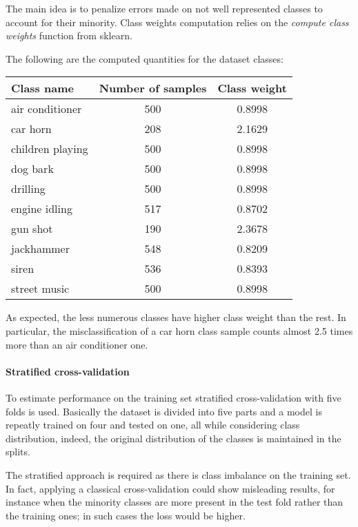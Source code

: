 The main idea is to penalize errors made on not well represented classes to account 
for their minority. Class weights computation relies on the \emph{compute class weights} function
from sklearn.~\cite{classweight}

The following are the computed quantities for the dataset classes:
\begin{center}
    \begin{tabular}{ |l|c|c| } 
        \hline
        Class name & Number of samples & Class weight \\
        \hline
        air conditioner & 500 & 0.8998 \\
        car horn & 208 & 2.1629 \\
        children playing & 500 & 0.8998 \\
        dog bark & 500 & 0.8998 \\
        drilling & 500 & 0.8998 \\
        engine idling & 517 & 0.8702 \\
        gun shot & 190 & 2.3678 \\
        jackhammer & 548 & 0.8209 \\
        siren & 536 & 0.8393 \\
        street music & 500 & 0.8998 \\
        \hline
    \end{tabular}
\end{center}
As expected, the less numerous classes have higher class weight than the rest. 
In particular, the misclassification of a car horn class sample
counts almost 2.5 times more than an air conditioner one.

\paragraph{Stratified cross-validation}
To estimate performance on the training set stratified cross-validation with 
five folds is used. Basically the dataset is divided into five parts 
and a model is repeatly trained on four and tested on one, all while considering class 
distribution, indeed, the original distribution of the classes is maintained 
in the splits.~\cite{stratified}

The stratified approach is required as there is class imbalance on the training set.
In fact, applying a classical cross-validation could show misleading results, 
for instance when the minority classes are more present 
in the test fold rather than the training ones; in such cases the loss would be 
higher.

